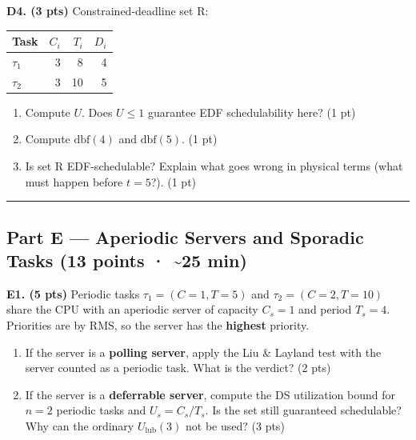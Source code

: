 \documentclass[
  11pt,
]{article}
\newcounter{none} %
\providecommand{\tightlist}{%
  \setlength{\itemsep}{0pt}\setlength{\parskip}{0pt}}
\begin{document}
\textbf{D4. (3 pts)} Constrained-deadline set R:

{\def\LTcaptype{none} %
\begin{longtable}[]{@{}lrrr@{}}
\toprule\noalign{}
Task & \(C_i\) & \(T_i\) & \(D_i\) \\
\midrule\noalign{}
\endhead
\bottomrule\noalign{}
\endlastfoot
\(\tau_1\) & 3 & 8 & 4 \\
\(\tau_2\) & 3 & 10 & 5 \\
\end{longtable}
}

\begin{enumerate}
\def\labelenumi{\alph{enumi}.}
\tightlist
\item
  Compute \(U\). Does \(U \le 1\) guarantee EDF schedulability here? (1
  pt)
\item
  Compute \(\text{dbf}(4)\) and \(\text{dbf}(5)\). (1 pt)
\item
  Is set R EDF-schedulable? Explain what goes wrong in physical terms
  (what must happen before \(t = 5\)?). (1 pt)
\end{enumerate}

\begin{center}\rule{0.5\linewidth}{0.5pt}\end{center}

\subsection{Part E --- Aperiodic Servers and Sporadic Tasks (13 points ·
\textasciitilde25
min)}\label{part-e-aperiodic-servers-and-sporadic-tasks-13-points-25-min}

\textbf{E1. (5 pts)} Periodic tasks \(\tau_1 = (C{=}1, T{=}5)\) and
\(\tau_2 = (C{=}2, T{=}10)\) share the CPU with an aperiodic server of
capacity \(C_s = 1\) and period \(T_s = 4\). Priorities are by RMS, so
the server has the \textbf{highest} priority.

\begin{enumerate}
\def\labelenumi{\alph{enumi}.}
\tightlist
\item
  If the server is a \textbf{polling server}, apply the Liu \& Layland
  test with the server counted as a periodic task. What is the verdict?
  (2 pts)
\item
  If the server is a \textbf{deferrable server}, compute the DS
  utilization bound for \(n = 2\) periodic tasks and \(U_s = C_s/T_s\).
  Is the set still guaranteed schedulable? Why can the ordinary
  \(U_{\text{lub}}(3)\) not be used? (3 pts)
\end{enumerate}
\end{document}
